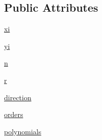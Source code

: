 \subsection*{Public Attributes}
\begin{DoxyCompactItemize}
\item 
\hyperlink{classscipy_1_1interpolate_1_1polyint_1_1PiecewisePolynomial_ac29518f2a5e0acb06080fcde633abb33}{xi}
\item 
\hyperlink{classscipy_1_1interpolate_1_1polyint_1_1PiecewisePolynomial_aad80e003a0ee7dda3e3df17cfc933e06}{yi}
\item 
\hyperlink{classscipy_1_1interpolate_1_1polyint_1_1PiecewisePolynomial_a68d7ed1c44a281daf3b96c721bbabe98}{n}
\item 
\hyperlink{classscipy_1_1interpolate_1_1polyint_1_1PiecewisePolynomial_a4c04564cf77ee6ab211d849d6062871c}{r}
\item 
\hyperlink{classscipy_1_1interpolate_1_1polyint_1_1PiecewisePolynomial_a7cfa9f2f703890558f49c461df6e0e77}{direction}
\item 
\hyperlink{classscipy_1_1interpolate_1_1polyint_1_1PiecewisePolynomial_acc1fb2bb9c805d277ffe254b5283eeba}{orders}
\item 
\hyperlink{classscipy_1_1interpolate_1_1polyint_1_1PiecewisePolynomial_a9c397291a13b9c87bd7b2cc1bbe332b4}{polynomials}
\end{DoxyCompactItemize}


